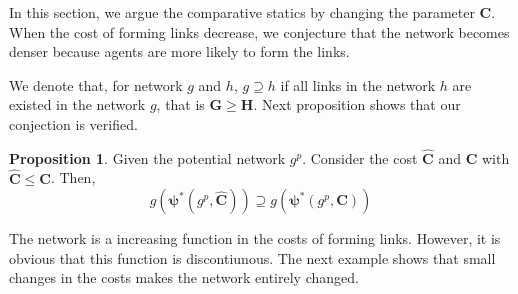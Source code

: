 \documentclass[12pt]{article}
\theoremstyle{definition}
\newtheorem{proposition}{Proposition}
\begin{document}
In this section, we argue the comparative statics by changing the parameter $\bm{C}$.
When the cost of forming links decrease, we conjecture that the network becomes denser because agents are more likely to form the links.

We denote that, for network $g$ and $h$, $g \supseteq h$ if all links in the network $h$ are existed in the network $g$, that is $\bm{G} \ge \bm{H}$.
Next proposition shows that our conjection is verified.

\begin{proposition}
Given the potential network $g^p$.
Consider the cost $\bm{\hat{C}}$ and $\bm{C}$ with $\bm{\hat{C}} \le \bm{C}$.
Then,
\[ g(\bm{\psi}^*(g^p, \bm{\hat{C}})) \supseteq g(\bm{\psi}^*(g^p, \bm{C})) \]
\end{proposition}

The network is a increasing function in the costs of forming links.
However, it is obvious that this function is discontiunous.
The next example shows that small changes in the costs makes the network entirely changed.
\end{document}
